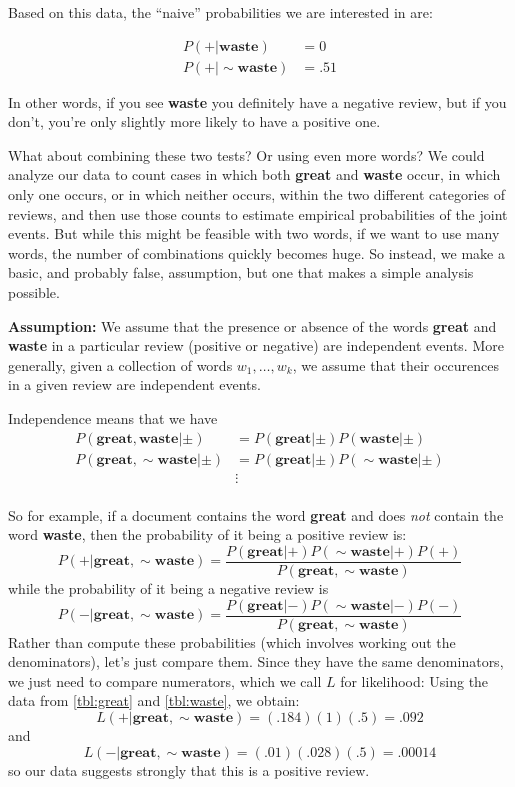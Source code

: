 \documentclass[
  oneside]{scrbook}
\begin{document}
Based on this data, the ``naive'' probabilities we are interested in
are:

\begin{align*}
P(+|\mathbf{waste}) &= 0\\
P(+|\sim\mathbf{waste}) &= .51
\end{align*}

In other words, if you see \textbf{waste} you definitely have a negative
review, but if you don't, you're only slightly more likely to have a
positive one.

What about combining these two tests? Or using even more words? We could
analyze our data to count cases in which both \textbf{great} and
\textbf{waste} occur, in which only one occurs, or in which neither
occurs, within the two different categories of reviews, and then use
those counts to estimate empirical probabilities of the joint events.
But while this might be feasible with two words, if we want to use many
words, the number of combinations quickly becomes huge. So instead, we
make a basic, and probably false, assumption, but one that makes a
simple analysis possible.

\textbf{Assumption:} We assume that the presence or absence of the words
\textbf{great} and \textbf{waste} in a particular review (positive or
negative) are independent events. More generally, given a collection of
words \(w_1,\ldots, w_k\), we assume that their occurences in a given
review are independent events.

Independence means that we have \begin{align*}
P(\mathbf{great},\mathbf{waste}|\pm) &= P(\mathbf{great}|\pm)P(\mathbf{waste}|\pm)\\
P(\mathbf{great},\sim\mathbf{waste}|\pm) &= P(\mathbf{great}|\pm)P(\sim\mathbf{waste}|\pm)\\
 &\vdots \\
\end{align*}

So for example, if a document contains the word \textbf{great} and does
\emph{not} contain the word \textbf{waste}, then the probability of it
being a positive review is: \[
P(+|\mathbf{great},\sim\mathbf{waste}) = \frac{P(\mathbf{great}|+)P(\sim\mathbf{waste}|+)P(+)}{P(\mathbf{great},\sim\mathbf{waste})}
\] while the probability of it being a negative review is \[
P(-|\mathbf{great},\sim\mathbf{waste}) = \frac{P(\mathbf{great}|-)P(\sim\mathbf{waste}|-)P(-)}{P(\mathbf{great},\sim\mathbf{waste})}
\] Rather than compute these probabilities (which involves working out
the denominators), let's just compare them. Since they have the same
denominators, we just need to compare numerators, which we call \(L\)
for likelihood: Using the data from \cref{tbl:great} and
\cref{tbl:waste}, we obtain: \[
L(+|\mathbf{great},\sim\mathbf{waste}) = (.184)(1)(.5) = .092
\] and \[
L(-|\mathbf{great},\sim\mathbf{waste}) = (.01)(.028)(.5) = .00014
\] so our data suggests strongly that this is a positive review.
\end{document}
